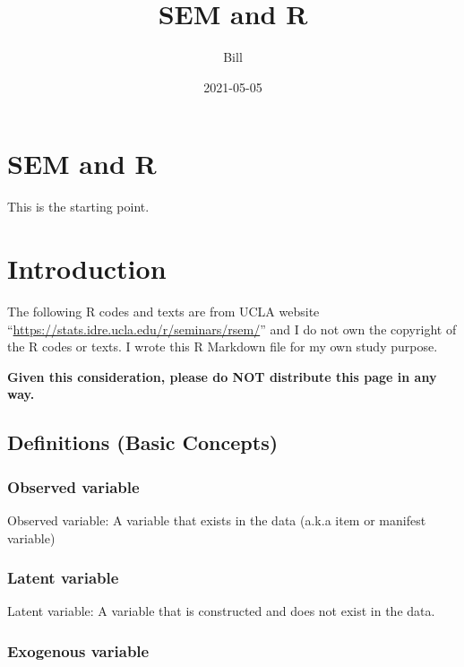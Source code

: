 \documentclass[]{book}
\title{SEM and R}
\author{Bill}
\date{2021-05-05}
\begin{document}
\maketitle

{
\setcounter{tocdepth}{1}
\tableofcontents
}
\hypertarget{sem-and-r}{%
\chapter{SEM and R}\label{sem-and-r}}

This is the starting point.

\hypertarget{intro}{%
\chapter{Introduction}\label{intro}}

The following R codes and texts are from UCLA website ``\url{https://stats.idre.ucla.edu/r/seminars/rsem/}'' and I do not own the copyright of the R codes or texts. I wrote this R Markdown file for my own study purpose.

\textbf{Given this consideration, please do NOT distribute this page in any way.}

\hypertarget{definitions-basic-concepts}{%
\section{Definitions (Basic Concepts)}\label{definitions-basic-concepts}}

\hypertarget{observed-variable}{%
\subsection{Observed variable}\label{observed-variable}}

Observed variable: A variable that exists in the data (a.k.a item or manifest variable)

\hypertarget{latent-variable}{%
\subsection{Latent variable}\label{latent-variable}}

Latent variable: A variable that is constructed and does not exist in the data.

\hypertarget{exogenous-variable}{%
\subsection{Exogenous variable}\label{exogenous-variable}}
\end{document}
